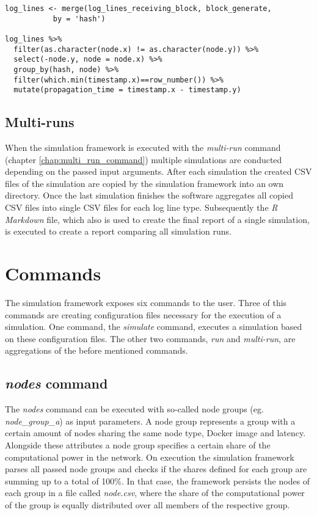 \begin{minipage}{\linewidth}
\begin{lstlisting}[caption=Calculation of propagation time with \textit{R}, label={lst:propagation_time}, basicstyle=\ttfamily, captionpos=b]
log_lines <- merge(log_lines_receiving_block, block_generate,
		   by = 'hash')

log_lines %>%
  filter(as.character(node.x) != as.character(node.y)) %>%
  select(-node.y, node = node.x) %>%
  group_by(hash, node) %>%
  filter(which.min(timestamp.x)==row_number()) %>%
  mutate(propagation_time = timestamp.x - timestamp.y)
\end{lstlisting}
\end{minipage}
 
\subsection{Multi-runs}

When the simulation framework is executed with the \textit{multi-run} command (chapter \ref{chap:multi_run_command}) multiple simulations are conducted depending on the passed input arguments.
After each simulation the created CSV files of the simulation are copied by the simulation framework into an own directory.
Once the last simulation finishes the software aggregates all copied CSV files into single CSV files for each log line type.
Subsequently the \textit{R Markdown} file, which also is used to create the final report of a single  simulation, is executed to create a report comparing all simulation runs.
 
\section{Commands}
\label{chap:commands}

The simulation framework exposes six commands to the user.
Three of this commands are creating configuration files necessary for the execution of a simulation. One command, the \textit{simulate} command, executes a simulation based on these configuration files.
The other two commands, \textit{run} and \textit{multi-run}, are aggregations of the before mentioned commands.

\subsection{\textit{nodes} command} \label{chap:nodes_command}

The \textit{nodes} command can be executed with so-called node groups (eg. \textit{node\_group\_a}) as input parameters.
A node group represents a group with a certain amount of nodes sharing the same node type, Docker image and latency.
Alongside these attributes a node group specifies a certain share of the computational power in the network.
On execution the simulation framework parses all passed node groups and checks if the shares defined for each group are summing up to a total of 100\%.
In that case, the framework persists the nodes of each group in a file called \textit{node.csv}, where the share of the computational power of the group is equally distributed over all members of the respective group.

